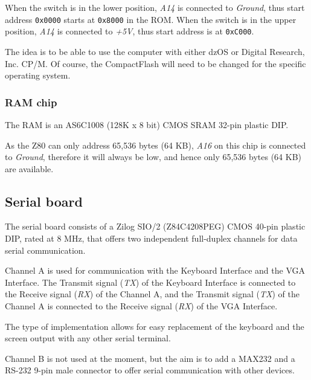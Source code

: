 \documentclass[a4paper,11pt]{article}
\begin{document}
    When the switch is in the lower position, \textit{A14} is connected to 
    \textit{Ground}, thus start address \texttt{0x0000} starts at 
    \texttt{0x8000} in the ROM. When the switch is in the upper position, 
    \textit{A14} is connected to \textit{+5V}, thus start address is at 
    \texttt{0xC000}.

    The idea is to be able to use the computer with either dzOS or Digital 
    Research, Inc. CP/M. Of course, the CompactFlash will need to be changed
    for the specific operating system.

    \subsubsection{RAM chip}

    The RAM is an AS6C1008 (128K x 8 bit) CMOS SRAM 32-pin plastic DIP.

    As the Z80 can only address 65,536 bytes (64 KB), \textit{A16} on this chip
    is connected to \textit{Ground}, therefore it will always be low, and hence
    only 65,536 bytes (64 KB) are available.

    \subsection{Serial board}

    The serial board consists of a Zilog SIO/2 (Z84C4208PEG) CMOS 40-pin plastic
    DIP, rated at 8 MHz, that offers two independent full-duplex channels for
    data serial communication.

    Channel A is used for communication with the Keyboard Interface and the VGA
    Interface. The Transmit signal (\textit{TX}) of the Keyboard Interface is
    connected to the Receive signal (\textit{RX}) of the Channel A, and the 
    Transmit signal (\textit{TX}) of the Channel A is connected to the Receive
    signal (\textit{RX}) of the VGA Interface.

    The type of implementation allows for easy replacement of the keyboard and
    the screen output with any other serial terminal.

    Channel B is not used at the moment, but the aim is to add a MAX232 and a 
    RS-232 9-pin male connector to offer serial communication with other
    devices.
\end{document}
